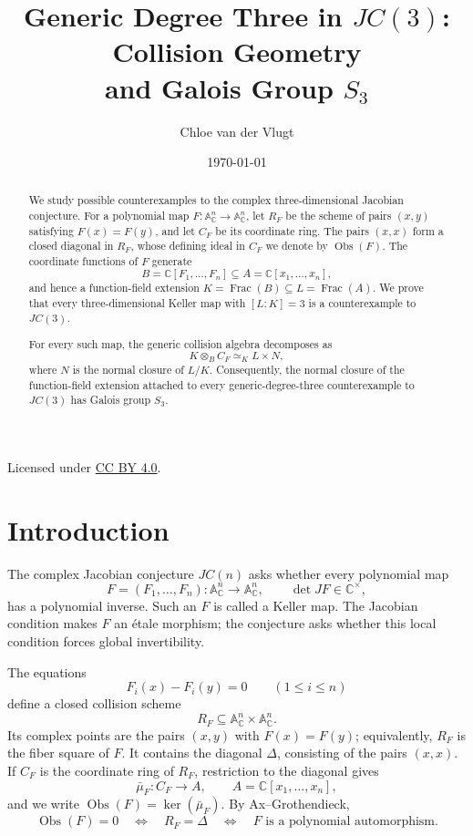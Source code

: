 \documentclass[11pt]{article}
\title{\texorpdfstring
  {Generic Degree Three in \(JC(3)\): Collision Geometry\\
   and Galois Group \(S_3\)}
  {Generic Degree Three in JC(3): Collision Geometry and Galois Group S3}}
\author{Chloe van der Vlugt}
\date{\today}
\theoremstyle{remark}
\DeclareMathOperator{\Frac}{Frac}
\newcommand{\A}{\mathbb A}
\newcommand{\C}{\mathbb C}
\newcommand{\Obs}{\operatorname{Obs}}
\begin{document}
\maketitle

\begin{abstract}
We study possible counterexamples to the complex three-dimensional
Jacobian conjecture.  For a polynomial map
\(F\colon\A^n_{\C}\to\A^n_{\C}\), let \(R_F\) be the scheme of pairs
\((x,y)\) satisfying \(F(x)=F(y)\), and let \(C_F\) be its coordinate
ring.  The pairs \((x,x)\) form a closed diagonal in \(R_F\), whose
defining ideal in \(C_F\) we denote by \(\Obs(F)\).  The coordinate
functions of \(F\) generate
\[
  B=\C[F_1,\dots,F_n]\subseteq A=\C[x_1,\dots,x_n],
\]
and hence a function-field extension
\(K=\Frac(B)\subseteq L=\Frac(A)\).
We prove that every three-dimensional Keller map with \([L:K]=3\) is a
counterexample to \(JC(3)\).

For every such map, the generic collision algebra decomposes as
\[
  K\otimes_B C_F\simeq_K L\times N,
\]
where \(N\) is the normal closure of \(L/K\).  Consequently, the normal
closure of the function-field extension attached to every
generic-degree-three counterexample to \(JC(3)\) has Galois group \(S_3\).
\end{abstract}

\begin{center}
  \small Licensed under
  \href{https://creativecommons.org/licenses/by/4.0/}
    {CC BY 4.0}.
\end{center}

\tableofcontents

\section{Introduction}
\label{sec:introduction}

The complex Jacobian conjecture \(JC(n)\) asks whether every polynomial map
\[
  F=(F_1,\dots,F_n)\colon\A^n_{\C}\longrightarrow\A^n_{\C},
  \qquad \det JF\in\C^\times,
\]
has a polynomial inverse.  Such an \(F\) is called a Keller map.  The
Jacobian condition makes \(F\) an \'etale morphism; the conjecture asks
whether this local condition forces global invertibility.

The equations
\[
  F_i(x)-F_i(y)=0\qquad(1\leq i\leq n)
\]
define a closed collision scheme
\[
  R_F\subseteq\A^n_{\C}\times\A^n_{\C}.
\]
Its complex points are the pairs \((x,y)\) with \(F(x)=F(y)\);
equivalently, \(R_F\) is the fiber square of \(F\).  It contains the
diagonal \(\Delta\), consisting of the pairs \((x,x)\).  If \(C_F\) is
the coordinate ring of \(R_F\), restriction to the diagonal gives
\[
  \bar\mu_F\colon C_F\longrightarrow A,
  \qquad A=\C[x_1,\dots,x_n],
\]
and we write \(\Obs(F)=\ker(\bar\mu_F)\).  By Ax--Grothendieck,
\[
  \Obs(F)=0
  \quad\Longleftrightarrow\quad
  R_F=\Delta
  \quad\Longleftrightarrow\quad
  F\text{ is a polynomial automorphism}.
\]
\end{document}
